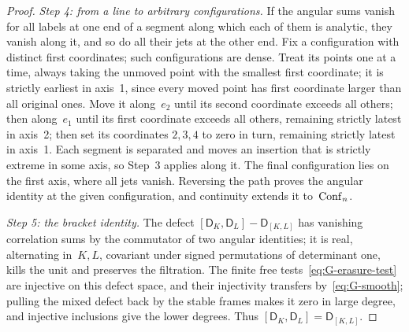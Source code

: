 \begin{proof}
\emph{Step 4: from a line to arbitrary configurations.} If the angular sums vanish for all labels at one end of a segment along which each of them is analytic, they vanish along it, and so do all their jets at the other end. Fix a configuration with distinct first coordinates; such configurations are dense. Treat its points one at a time, always taking the unmoved point with the smallest first coordinate; it is strictly earliest in axis~1, since every moved point has first coordinate larger than all original ones. Move it along~$e_2$ until its second coordinate exceeds all others; then along~$e_1$ until its first coordinate exceeds all others, remaining strictly latest in axis~2; then set its coordinates $2,3,4$ to zero in turn, remaining strictly latest in axis~1. Each segment is separated and moves an insertion that is strictly extreme in some axis, so Step~3 applies along it. The final configuration lies on the first axis, where all jets vanish. Reversing the path proves the angular identity at the given configuration, and continuity extends it to~$\mathrm{Conf}_{n}$.

\emph{Step 5: the bracket identity.} The defect $[\mathsf D_K,\mathsf D_L]-\mathsf D_{[K,L]}$ has vanishing correlation sums by the commutator of two angular identities; it is real, alternating in~$K,L$, covariant under signed permutations of determinant one, kills the unit and preserves the filtration. The finite free tests~\eqref{eq:G-erasure-test} are injective on this defect space, and their injectivity transfers by~\eqref{eq:G-smooth}; pulling the mixed defect back by the stable frames makes it zero in large degree, and injective inclusions give the lower degrees. Thus $[\mathsf D_K,\mathsf D_L]=\mathsf D_{[K,L]}$.


\end{proof}
